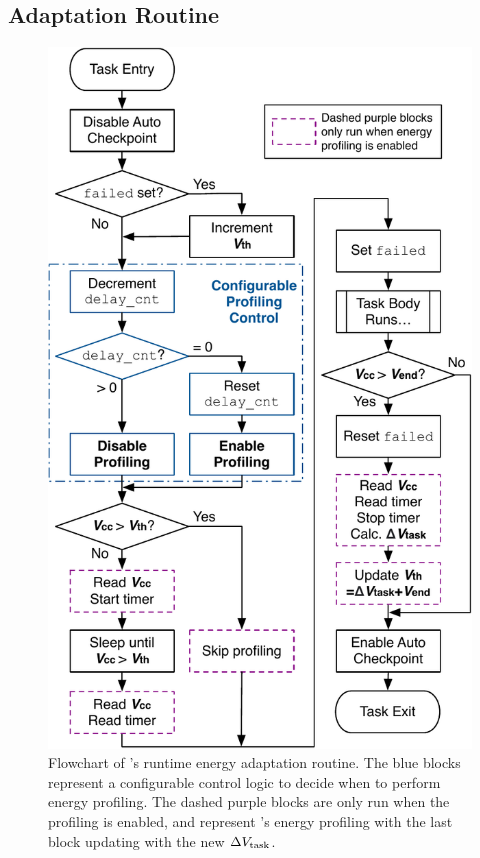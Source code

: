 
\subsection{Adaptation Routine}

\begin{figure}
    \centering
    \includegraphics[width=0.9\columnwidth]{ch5_optic/figures/flowchart.pdf}
    \caption{Flowchart of \nn{}'s runtime energy adaptation routine. The blue blocks represent a configurable control logic to decide when to perform energy profiling. The dashed purple blocks are only run when the profiling is enabled, and represent \nn{}'s energy profiling with the last block updating  with the new $\Delta V_{\text{task}}$. }
    \label{fig:opta_flowchart}
\end{figure}

